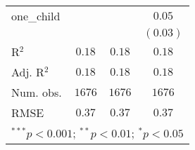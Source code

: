 \begin{table}
\begin{center}
\begin{tabular}{l c c c}
one\_child                    &               &               & $0.05$        \\
                              &               &               & $(0.03)$      \\
\hline
R$^2$                         & $0.18$        & $0.18$        & $0.18$        \\
Adj. R$^2$                    & $0.18$        & $0.18$        & $0.18$        \\
Num. obs.                     & $1676$        & $1676$        & $1676$        \\
RMSE                          & $0.37$        & $0.37$        & $0.37$        \\
\hline
\multicolumn{4}{l}{\scriptsize{$^{***}p<0.001$; $^{**}p<0.01$; $^{*}p<0.05$}}
\end{tabular}
\label{table:coefficients}
\end{center}
\end{table}
